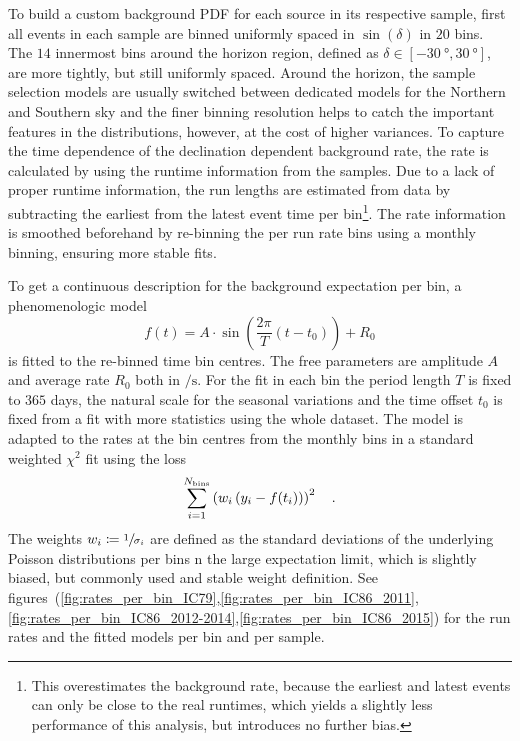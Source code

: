 To build a custom background PDF for each source in its respective sample, first all events in each sample are binned uniformly spaced in $\sin(\delta)$ in $\num{20}$ bins.
The $\num{14}$ innermost bins around the horizon region, defined as $\delta\in[\SI{-30}{\degree}, \SI{30}{\degree}]$, are more tightly, but still uniformly spaced.
Around the horizon, the sample selection models are usually switched between dedicated models for the Northern and Southern sky and the finer binning resolution helps to catch the important features in the distributions, however, at the cost of higher variances.
To capture the time dependence of the declination dependent background rate, the rate is calculated by using the runtime information from the samples.
Due to a lack of proper runtime information, the run lengths are estimated from data by subtracting the earliest from the latest event time per bin\footnote{This overestimates the background rate, because the earliest and latest events can only be close to the real runtimes, which yields a slightly less performance of this analysis, but introduces no further bias.}.
The rate information is smoothed beforehand by re-binning the per run rate bins using a monthly binning, ensuring more stable fits.

To get a continuous description for the background expectation per bin, a phenomenologic model
\begin{equation}
  \label{equ:rate_model}
  f(t)
  = A\cdot
    \sin\left(\frac{2\pi}{T}\left(t - t_0\right)\right) + R_0
\end{equation}
is fitted to the re-binned time bin centres.
The free parameters are amplitude $A$ and average rate $R_0$ both in $\si{\per\s}$.
For the fit in each bin the period length $T$ is fixed to $365$ days, the natural scale for the seasonal variations and the time offset $t_0$ is fixed from a fit with more statistics using the whole dataset.
The model is adapted to the rates at the bin centres from the monthly bins in a standard weighted $\chi^2$ fit using the loss
\begin{equation}
  \sum_{i=1}^{N_\text{bins}} \left(w_i\left(y_i - f(t_i)\right)\right)^2
  \quad\text{.}
\end{equation}
The weights $w_i\coloneqq\sfrac{1}{\sigma_i}$ are defined as the standard deviations of the underlying Poisson distributions per bins n the large expectation limit, which is slightly biased, but commonly used and stable weight definition.
See figures~(\ref{fig:rates_per_bin_IC79},\ref{fig:rates_per_bin_IC86_2011},\ref{fig:rates_per_bin_IC86_2012-2014},\ref{fig:rates_per_bin_IC86_2015}) for the run rates and the fitted models per bin and per sample.

